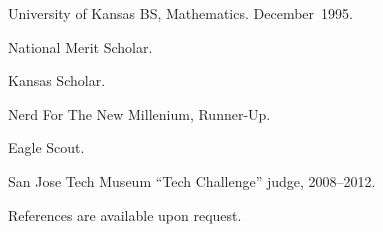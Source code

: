 \documentclass{resume}
\begin{document}
\begin{resume}
\begin{Education}
\begin{job}{University of Kansas}
  BS, Mathematics. December~1995.
\end{job}
\end{Education}

\begin{Awards}
  National Merit Scholar.

  Kansas Scholar.

  Nerd For The New Millenium, Runner-Up.

  Eagle Scout. 
\end{Awards}

\begin{Activities}
  San Jose Tech Museum ``Tech Challenge'' judge, 2008--2012.
\end{Activities}

\begin{References}
References are available upon request.
\end{References}

\end{resume}
\end{document}
